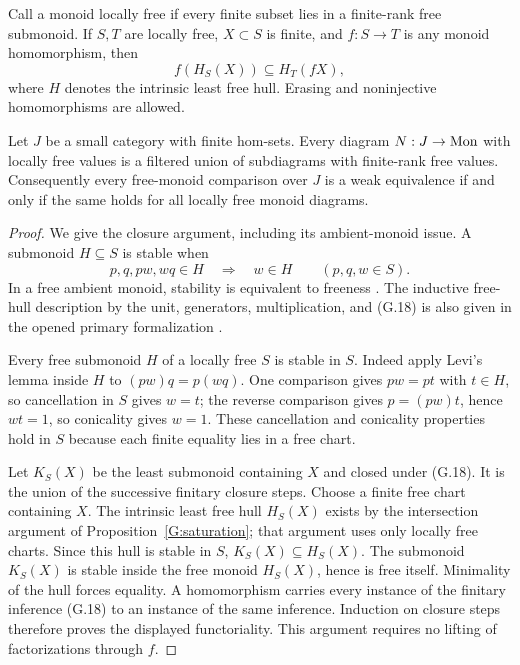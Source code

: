 \begin{lemma}
\label{G:hullfunctorial}
Call a monoid locally free if every finite subset lies in a
finite-rank free submonoid. If $S,T$ are locally free, $X\subset S$
is finite, and $f:S\to T$ is any monoid homomorphism, then
\[
 f(H_S(X))\subseteq H_T(fX),
\]
where $H$ denotes the intrinsic least free hull. Erasing and
noninjective homomorphisms are allowed.

Let $J$ be a small category with finite hom-sets. Every diagram
$N:J\to\mathrm{Mon}$ with locally free values is a filtered union of
subdiagrams with finite-rank free values. Consequently every
free-monoid comparison over $J$ is a weak equivalence if and
only if the same holds for all locally free monoid diagrams.
\end{lemma}
\begin{proof}
We give the closure argument, including its ambient-monoid issue.
A submonoid $H\subseteq S$ is stable when
\[
 p,q,pw,wq\in H\quad\Longrightarrow\quad w\in H
 \qquad(p,q,w\in S).
 \tag{G.18}
\]
In a free ambient monoid, stability is equivalent to freeness
\cite[Theorem~1, p.~84]{GCarpi2014}. The inductive free-hull
description by the unit, generators, multiplication, and
(G.18) is also given in the opened primary formalization
\cite[\texttt{Submonoids}: \texttt{free\_hull.intros},
\texttt{free\_basis\_code}, \texttt{free\_hull\_min}]{GHolubRaskaStarosta2021}.

Every free submonoid $H$ of a locally free $S$ is stable in $S$.
Indeed apply Levi's lemma inside $H$ to
$(pw)q=p(wq)$. One comparison gives $pw=pt$ with $t\in H$,
so cancellation in $S$ gives $w=t$; the reverse comparison
gives $p=(pw)t$, hence $wt=1$, so conicality gives $w=1$.
These cancellation and conicality properties hold in $S$ because
each finite equality lies in a free chart.

Let $K_S(X)$ be the least submonoid containing $X$ and closed
under (G.18). It is the union of the successive finitary closure
steps. Choose a finite free chart containing $X$. The intrinsic
least free hull $H_S(X)$ exists by the intersection argument of
Proposition~\ref{G:saturation}; that argument uses only locally
free charts. Since this hull is stable in $S$,
$K_S(X)\subseteq H_S(X)$. The submonoid $K_S(X)$ is stable
inside the free monoid $H_S(X)$, hence is free itself. Minimality
of the hull forces equality. A homomorphism carries every instance
of the finitary inference (G.18) to an instance of the same
inference. Induction on closure steps therefore proves the
displayed functoriality. This argument requires no lifting of
factorizations through $f$.


\end{proof}
